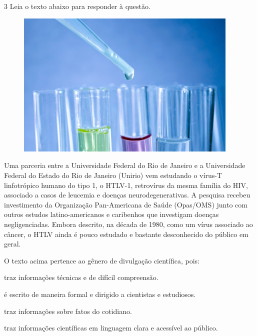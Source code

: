 \num{3} Leia o texto abaixo para responder à questão.

\begin{myquote}

\begin{figure}[H]
\centering
\includegraphics[width=0.95\textwidth]{./imgSAEB_7_POR/media/image61.png}
\end{figure} 

Uma parceria entre a Universidade Federal do Rio de Janeiro e a
Universidade Federal do Estado do Rio de Janeiro (Unirio) vem estudando
o vírus-T linfotrópico humano do tipo 1, o HTLV-1, retrovírus da mesma
família do HIV, associado a casos de leucemia e doenças
neurodegenerativas. A pesquisa recebeu investimento da Organização
Pan-Americana de Saúde (Opas/OMS) junto com outros estudos
latino-americanos e caribenhos que investigam doenças negligenciadas.
Embora descrito, na década de 1980, como um vírus associado ao câncer, o
HTLV ainda é pouco estudado e bastante desconhecido do público em geral.


\end{myquote}

O texto acima pertence ao gênero de divulgação científica, pois:

\begin{escolha}
  
  \item traz informações técnicas e de difícil compreensão.
  
  \item é escrito de maneira formal e dirigido a cientistas e estudiosos.
  
  \item traz informações sobre fatos do cotidiano.
  
  \item traz informações científicas em linguagem clara e acessível ao público.

\end{escolha}

